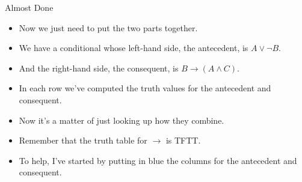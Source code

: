 \documentclass[
  ignorenonframetext,
]{beamer}
\providecommand{\tightlist}{%
  \setlength{\itemsep}{0pt}\setlength{\parskip}{0pt}}
\renewcommand{\,}{\text{, }}
\begin{document}
\begin{frame}{Almost Done}
\protect\hypertarget{almost-done}{}
\begin{itemize}
\tightlist
\item
  Now we just need to put the two parts together.
\item
  We have a conditional whose left-hand side, the antecedent, is
  \(A \vee \neg B\).
\item
  And the right-hand side, the consequent, is
  \(B \rightarrow (A \wedge C)\).
\item
  In each row we've computed the truth values for the antecedent and
  consequent.
\item
  Now it's a matter of just looking up how they combine.
\item
  Remember that the truth table for \(\rightarrow\) is TFTT.
\item
  To help, I've started by putting in blue the columns for the
  antecedent and consequent.
\end{itemize}
\end{frame}
\end{document}
